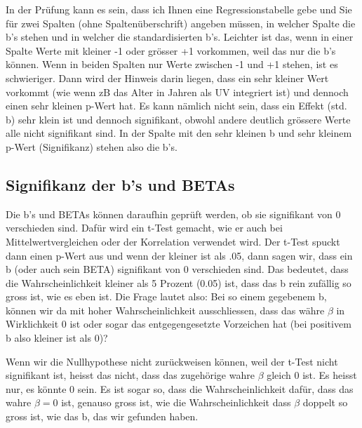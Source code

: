 \documentclass[
  10pt,
  letterpaper,
  a4paper, twoside]{scrreprt}
\begin{document}
\begin{tcolorbox}
In der Prüfung kann es sein, dass ich Ihnen eine Regressionstabelle gebe
und Sie für zwei Spalten (ohne Spaltenüberschrift) angeben müssen, in
welcher Spalte die b's stehen und in welcher die standardisierten b's.
Leichter ist das, wenn in einer Spalte Werte mit kleiner -1 oder grösser
+1 vorkommen, weil das nur die b's können. Wenn in beiden Spalten nur
Werte zwischen -1 und +1 stehen, ist es schwieriger. Dann wird der
Hinweis darin liegen, dass ein sehr kleiner Wert vorkommt (wie wenn zB
das Alter in Jahren als UV integriert ist) und dennoch einen sehr
kleinen p-Wert hat. Es kann nämlich nicht sein, dass ein Effekt (std. b)
sehr klein ist und dennoch signifikant, obwohl andere deutlich grössere
Werte alle nicht signifikant sind. In der Spalte mit den sehr kleinen b
und sehr kleinem p-Wert (Signifikanz) stehen also die b's.

\end{tcolorbox}

\subsection{Signifikanz der b's und
BETAs}\label{signifikanz-der-bs-und-betas}

Die b's und BETAs können daraufhin geprüft werden, ob sie signifikant
von 0 verschieden sind. Dafür wird ein t-Test gemacht, wie er auch bei
Mittelwertvergleichen oder der Korrelation verwendet wird. Der t-Test
spuckt dann einen p-Wert aus und wenn der kleiner ist als .05, dann
sagen wir, dass ein b (oder auch sein BETA) signifikant von 0
verschieden sind. Das bedeutet, dass die Wahrscheinlichkeit kleiner als
5 Prozent (0.05) ist, dass das b rein zufällig so gross ist, wie es eben
ist. Die Frage lautet also: Bei so einem gegebenem b, können wir da mit
hoher Wahrscheinlichkeit ausschliessen, dass das währe \(\beta\) in
Wirklichkeit 0 ist oder sogar das entgegengesetzte Vorzeichen hat (bei
positivem b also kleiner ist als 0)?

\begin{tcolorbox}[enhanced jigsaw, coltitle=black, opacitybacktitle=0.6, toptitle=1mm, colbacktitle=quarto-callout-caution-color!10!white, colback=white, toprule=.15mm, opacityback=0, bottomrule=.15mm, arc=.35mm, colframe=quarto-callout-caution-color-frame, leftrule=.75mm, titlerule=0mm, breakable, left=2mm, rightrule=.15mm, title={Fehlende Signifikanz sagt nicht, dass das wahre \textbf{\(\beta = 0\)}
ist!}, bottomtitle=1mm]

Wenn wir die Nullhypothese nicht zurückweisen können, weil der t-Test
nicht signifikant ist, heisst das nicht, dass das zugehörige wahre
\(\beta\) gleich 0 ist. Es heisst nur, es könnte 0 sein. Es ist sogar
so, dass die Wahrscheinlichkeit dafür, dass das wahre \(\beta = 0\) ist,
genauso gross ist, wie die Wahrscheinlichkeit dass \(\beta\) doppelt so
gross ist, wie das b, das wir gefunden haben.

\end{tcolorbox}
\end{document}
